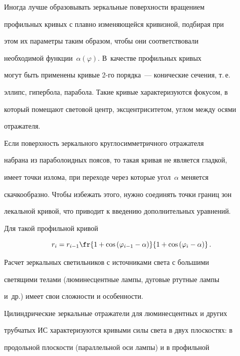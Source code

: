   


  Иногда лучше образовывать зеркальные поверхности вращением 


профильных кривых с плавно изменяющейся кривизной, подбирая при 


этом их параметры таким образом, чтобы они соответствовали 


необходимой функции~$\alpha(\varphi)$. В~качестве профильных кривых 


могут быть применены кривые 2-го порядка~--- конические сечения, т.\,е.\ 


эллипс, гипербола, парабола. Такие кривые характеризуются фокусом, в 


который помещают световой центр, эксцентриситетом, углом между осями 


отражателя.


  


  Если поверхность зеркального круглосимметричного отражателя 


набрана из параболоидных поясов, то такая кривая не является гладкой, 


имеет точки излома, при переходе через которые угол~$\alpha$ меняется 


скачкообразно. Чтобы избежать этого, нужно соединять точки границ зон 


лекальной кривой, что приводит к введению дополнительных уравнений. 


Для такой профильной кривой


  $$


  r_i=r_{i-1}\fr{1+\cos\left( \varphi_{i-1}-\alpha\right)}{1+\cos\left(\varphi_i-


\alpha\right)}\,.


  $$


  


  Расчет зеркальных светильников с источниками света с большими 


светящими телами (люминесцентные лампы, дуговые ртутные лампы 


и~др.) имеет свои сложности и особенности.


  


  Цилиндрические зеркальные отражатели для люминесцентных и других 


трубчатых ИС характеризуются кривыми силы света в двух плоскостях: в 


продольной плоскости (параллельной оси лампы) и в профильной 


